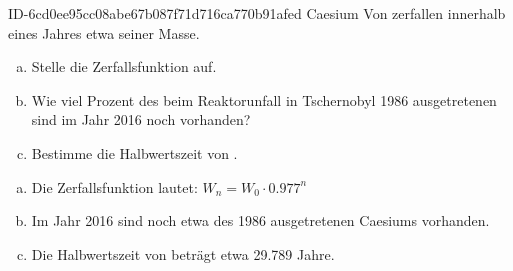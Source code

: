 \begin{exercise}
      {ID-6cd0ee95cc08abe67b087f71d716ca770b91afed}
      {Caesium}
  \ifproblem\problem
    Von  zerfallen innerhalb eines
    Jahres etwa  seiner Masse.
    \begin{enumerate}[a)]
      \item Stelle die Zerfallsfunktion auf.
      \item Wie viel Prozent des beim Reaktorunfall in
            Tschernobyl \num{1986} ausgetretenen 
            sind im Jahr \num{2016} noch vorhanden?
      \item Bestimme die Halbwertszeit von .
    \end{enumerate}
  \fi
  \ifoutcome\outcome
    \begin{enumerate}[a)]
      \item Die Zerfallsfunktion lautet: $W_{n}=W_{0}\cdot\num{0.977}^{n}$
      \item Im Jahr \num{2016} sind noch etwa  des
            \num{1986} ausgetretenen Caesiums vorhanden.
      \item Die Halbwertszeit von  beträgt etwa
            \num{29.789} Jahre.
    \end{enumerate}
  \fi
\end{exercise}
